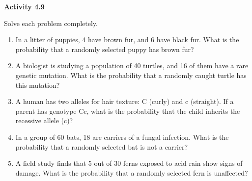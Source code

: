  \vspace{0.3ex}
\noindent\textbf{Activity 4.9}

\vspace{0.2ex}

Solve each problem completely.
\begin{enumerate}[noitemsep, label = \color{blue}\arabic*. ]
    \item In a litter of puppies, 4 have brown fur, and 6 have black fur. What is the probability that a randomly selected puppy has brown fur?
    \item A biologist is studying a population of 40 turtles, and 16 of them have a rare genetic mutation. What is the probability that a randomly caught turtle has this mutation?
    \item A human has two alleles for hair texture: C (curly) and c (straight). If a parent has genotype Cc, what is the probability that the child inherits the recessive allele (c)?
    \item In a group of 60 bats, 18 are carriers of a fungal infection. What is the probability that a randomly selected bat is not a carrier?
    \item A field study finds that 5 out of 30 ferns exposed to acid rain show signs of damage. What is the probability that a randomly selected fern is unaffected?
\end{enumerate}


